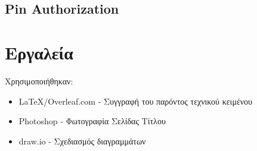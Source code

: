 \documentclass{article}
\begin{document}
\subsection{Pin Authorization}
\noindent{}


\section{Εργαλεία}
Χρησιμοποιήθηκαν:
\begin{itemize}
    \item \LaTeX/Overleaf.com - Συγγραφή του παρόντος τεχνικού κειμένου
    \item Photoshop - Φωτογραφία Σελίδας Τίτλου
    \item draw.io - Σχεδιασμός διαγραμμάτων
\end{itemize}
\end{document}
